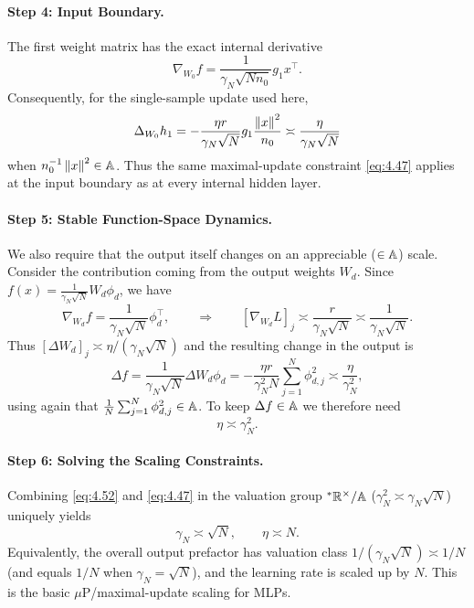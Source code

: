 \paragraph{Step 4: Input Boundary.} The first weight matrix has the exact internal derivative
\begin{equation}\label{eq:4.48}
\nabla_{W_0} f = \frac{1}{\gamma_N\sqrt{N n_0}} g_1 x^\top.
\end{equation}
Consequently, for the single-sample update used here,
\begin{equation}\label{eq:4.49}
\Delta_{W_0} h_1 = -\frac{\eta r}{\gamma_N\sqrt{N}} g_1 \frac{\left\lVert x \right\rVert^2}{n_0} \asymp \frac{\eta}{\gamma_N\sqrt{N}}
\end{equation}
when $n_0^{-1}\left\lVert x \right\rVert^2 \in \mathbb{A}$. Thus the same maximal-update constraint \eqref{eq:4.47} applies at the input boundary as at every internal hidden layer.

\paragraph{Step 5: Stable Function-Space Dynamics.} We also require that the output itself changes on an appreciable ($\in \mathbb{A}$) scale. Consider the contribution coming from the output weights $W_d$. Since $f(x) = \frac{1}{\gamma_N\sqrt{N}}W_d\phi_d$, we have
\begin{equation}\label{eq:4.50}
\nabla_{W_d} f = \frac{1}{\gamma_N\sqrt{N}}\phi_d^\top, \qquad \Longrightarrow \qquad [\nabla_{W_d} L]_j \asymp \frac{r}{\gamma_N\sqrt{N}} \asymp \frac{1}{\gamma_N\sqrt{N}}.
\end{equation}
Thus $[\Delta W_d]_j \asymp \eta / (\gamma_N\sqrt{N})$ and the resulting change in the output is
\begin{equation}\label{eq:4.51}
\Delta f = \frac{1}{\gamma_N\sqrt{N}}\Delta W_d \phi_d = -\frac{\eta r}{\gamma_N^2 N}\sum_{j=1}^N \phi_{d, j}^2 \asymp \frac{\eta}{\gamma_N^2},
\end{equation}
using again that $\frac{1}{N}\sum_{j=1}^N \phi_{d, j}^2 \in \mathbb{A}$. To keep $\Delta f \in \mathbb{A}$ we therefore need
\begin{equation}\label{eq:4.52}
\eta \asymp \gamma_N^2.
\end{equation}

\paragraph{Step 6: Solving the Scaling Constraints.} Combining \eqref{eq:4.52} and \eqref{eq:4.47} in the valuation group ${}^*\mathbb{R}^\times / \mathbb{A}$ ($\gamma_N^2 \asymp \gamma_N\sqrt{N}$) uniquely yields
\begin{equation}\label{eq:4.53}
\gamma_N \asymp \sqrt{N}, \qquad \eta \asymp N.
\end{equation}
Equivalently, the overall output prefactor has valuation class $1 / (\gamma_N\sqrt{N}) \asymp 1/N$ (and equals $1/N$ when $\gamma_N = \sqrt{N}$), and the learning rate is scaled up by $N$. This is the basic $\mu$P/maximal-update scaling for MLPs.

